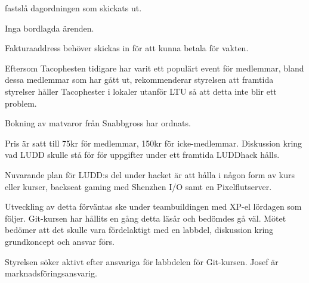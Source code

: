 \documentclass{protokoll}
\date{2019-10-15}  %
\begin{document}
\newpage  


\begin{beslut}
     \att fastslå dagordningen som skickats ut.
\end{beslut}


Inga bordlagda ärenden.


Fakturaaddress behöver skickas in för att kunna betala för vakten. 


Eftersom Tacophesten tidigare har varit ett populärt event för medlemmar, bland
dessa medlemmar som har gått ut, rekommenderar styrelsen att framtida styrelser
håller Tacophester i lokaler utanför LTU så att detta inte blir ett problem. 


Bokning av matvaror från Snabbgross har ordnats.


Pris är satt till 75kr för medlemmar, 150kr för icke-medlemmar.
Diskussion kring vad LUDD skulle stå för för uppgifter under ett framtida
LUDDhack hålls. 


Nuvarande plan för LUDD:s del under hacket är att hålla i någon form av kurs
eller kurser, backseat gaming med Shenzhen I/O samt en Pixelflutserver.


Utveckling av detta förväntas ske under teambuildingen med XP-el lördagen som
följer.
Git-kursen har hållits en gång detta läsår och bedömdes gå väl. Mötet bedömer
att det skulle vara fördelaktigt med en labbdel, diskussion kring grundkoncept 
och ansvar förs. 


Styrelsen söker aktivt efter ansvariga för labbdelen för Git-kursen.
Josef är marknadsföringsansvarig.

 
\end{document}
